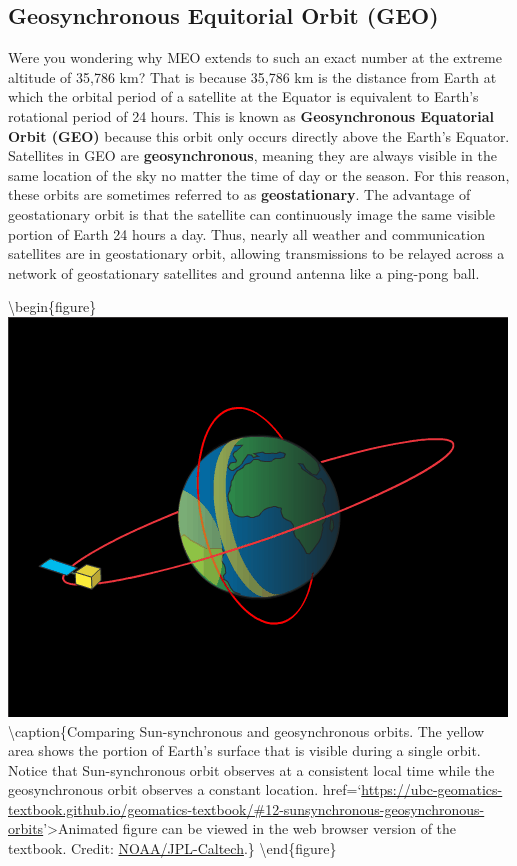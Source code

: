\documentclass[
]{book}
\begin{document}
\subsection{Geosynchronous Equitorial Orbit (GEO)}\label{geosynchronous-equitorial-orbit-geo}

Were you wondering why MEO extends to such an exact number at the extreme altitude of 35,786 km? That is because 35,786 km is the distance from Earth at which the orbital period of a satellite at the Equator is equivalent to Earth's rotational period of 24 hours. This is known as \textbf{Geosynchronous Equatorial Orbit (GEO)} because this orbit only occurs directly above the Earth's Equator. Satellites in GEO are \textbf{geosynchronous}, meaning they are always visible in the same location of the sky no matter the time of day or the season. For this reason, these orbits are sometimes referred to as \textbf{geostationary}. The advantage of geostationary orbit is that the satellite can continuously image the same visible portion of Earth 24 hours a day. Thus, nearly all weather and communication satellites are in geostationary orbit, allowing transmissions to be relayed across a network of geostationary satellites and ground antenna like a ping-pong ball.

\textbackslash begin\{figure\}
\includegraphics[width=0.75\linewidth]{images/12-sunsynchronous-geosynchronous-orbits} \textbackslash caption\{Comparing Sun-synchronous and geosynchronous orbits. The yellow area shows the portion of Earth's surface that is visible during a single orbit. Notice that Sun-synchronous orbit observes at a consistent local time while the geosynchronous orbit observes a constant location. href=`\url{https://ubc-geomatics-textbook.github.io/geomatics-textbook/\#12-sunsynchronous-geosynchronous-orbits}'\textgreater Animated figure can be viewed in the web browser version of the textbook. Credit: \href{https://scijinks.gov/about/}{NOAA/JPL-Caltech}.\}\label{fig:12-sunsynchronous-geosynchronous-orbits}
\textbackslash end\{figure\}
\end{document}
